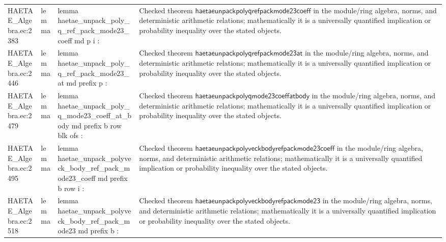 \documentclass[10pt]{article}
\begin{document}
\begin{longtable}{L{0.11\textwidth}L{0.055\textwidth}L{0.385\textwidth}L{0.41\textwidth}}
HAETAE\_\allowbreak{}Algebra.\allowbreak{}ec:\allowbreak{}2383 & lemma & {\ttfamily\scriptsize lemma haetae\_\allowbreak{}unpack\_\allowbreak{}poly\_\allowbreak{}q\_\allowbreak{}ref\_\allowbreak{}pack\_\allowbreak{}mode23\_\allowbreak{}coeff md p i :} & Checked theorem $\mathsf{haetaeunpackpolyqrefpackmode23coeff}$ in the module/ring algebra, norms, and deterministic arithmetic relations; mathematically it is a universally quantified implication or probability inequality over the stated objects. \\
HAETAE\_\allowbreak{}Algebra.\allowbreak{}ec:\allowbreak{}2446 & lemma & {\ttfamily\scriptsize lemma haetae\_\allowbreak{}unpack\_\allowbreak{}poly\_\allowbreak{}q\_\allowbreak{}ref\_\allowbreak{}pack\_\allowbreak{}mode23\_\allowbreak{}at md prefix p :} & Checked theorem $\mathsf{haetaeunpackpolyqrefpackmode23at}$ in the module/ring algebra, norms, and deterministic arithmetic relations; mathematically it is a universally quantified implication or probability inequality over the stated objects. \\
HAETAE\_\allowbreak{}Algebra.\allowbreak{}ec:\allowbreak{}2479 & lemma & {\ttfamily\scriptsize lemma haetae\_\allowbreak{}unpack\_\allowbreak{}poly\_\allowbreak{}q\_\allowbreak{}mode23\_\allowbreak{}coeff\_\allowbreak{}at\_\allowbreak{}body md prefix b row blk ofs :} & Checked theorem $\mathsf{haetaeunpackpolyqmode23coeffatbody}$ in the module/ring algebra, norms, and deterministic arithmetic relations; mathematically it is a universally quantified implication or probability inequality over the stated objects. \\
HAETAE\_\allowbreak{}Algebra.\allowbreak{}ec:\allowbreak{}2495 & lemma & {\ttfamily\scriptsize lemma haetae\_\allowbreak{}unpack\_\allowbreak{}polyveck\_\allowbreak{}body\_\allowbreak{}ref\_\allowbreak{}pack\_\allowbreak{}mode23\_\allowbreak{}coeff md prefix b row i :} & Checked theorem $\mathsf{haetaeunpackpolyveckbodyrefpackmode23coeff}$ in the module/ring algebra, norms, and deterministic arithmetic relations; mathematically it is a universally quantified implication or probability inequality over the stated objects. \\
HAETAE\_\allowbreak{}Algebra.\allowbreak{}ec:\allowbreak{}2518 & lemma & {\ttfamily\scriptsize lemma haetae\_\allowbreak{}unpack\_\allowbreak{}polyveck\_\allowbreak{}body\_\allowbreak{}ref\_\allowbreak{}pack\_\allowbreak{}mode23 md prefix b :} & Checked theorem $\mathsf{haetaeunpackpolyveckbodyrefpackmode23}$ in the module/ring algebra, norms, and deterministic arithmetic relations; mathematically it is a universally quantified implication or probability inequality over the stated objects. \\

\end{longtable}
\end{document}
